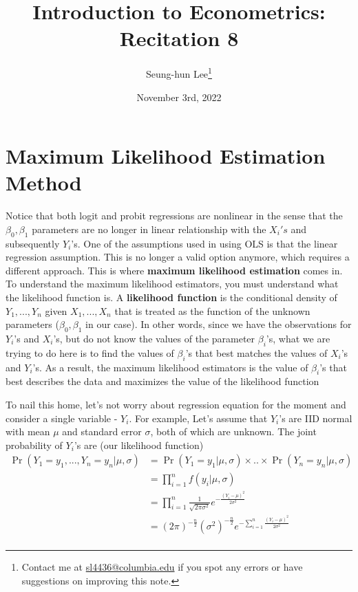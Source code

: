 \documentclass[12pt]{article}
\title{Introduction to Econometrics: Recitation 8}
\theoremstyle{definition}
\theoremstyle{property}
\theoremstyle{assumption}
\theoremstyle{example}
\theoremstyle{comment}
\begin{document}
\linespread{1.25}
\onehalfspacing

\author{Seung-hun Lee\footnote{Contact me at \href{mailto:sl4436@columbia.edu}{sl4436@columbia.edu} if you spot any errors or have suggestions on improving this note.}}
\date{November 3rd, 2022}
\maketitle
\thispagestyle{firstpage}

\section{Maximum Likelihood Estimation Method}
Notice that both logit and probit regressions are nonlinear in the sense that the $\beta_0, \beta_1$ parameters are no longer in linear relationship with the $X_i's$ and subsequently $Y_i$'s. One of the assumptions used in using OLS is that the linear regression assumption. This is no longer a valid option anymore, which requires a different approach. This is where \textbf{maximum likelihood estimation} comes in. To understand the maximum likelihood estimators, you must understand what the likelihood function is. A \textbf{likelihood function} is the conditional density of $Y_1,...,Y_n$ given $X_1,...,X_n$ that is treated as the function of the unknown parameters ($\beta_0, \beta_1$ in our case). In other words, since we have the observations for $Y_i$'s and $X_i$'s, but do  not know the values of the parameter $\beta_i$'s, what we are trying to do here is to find the values of $\beta_i$'s that best matches the values of $X_i$'s and $Y_i$'s. As a result, the maximum likelihood estimators is the value of $\beta_i$'s that best describes the data and maximizes the value of the likelihood function \par\medskip
To nail this home, let's not worry about regression equation for the moment and consider a single variable - $Y_i$. For example, Let's assume that $Y_i$'s are IID normal with mean $\mu$ and standard error $\sigma$, both of which are unknown. The joint probability of $Y_i$'s are (our likelihood function)
\[
\begin{aligned}
\Pr(Y_1=y_1,...,Y_n=y_n|\mu,\sigma)&=\Pr(Y_1 = y_1|\mu,\sigma)\times..\times\Pr(Y_n=y_n|\mu,\sigma)\\
&=\prod_{i=1}^nf(y_i|\mu,\sigma)\\
&=\prod_{i=1}^n\frac{1}{\sqrt{2\pi\sigma^2}}e^{-\frac{(Y_i-\mu)^2}{2\sigma^2}}\\
&=(2\pi)^{-\frac{n}{2}} (\sigma^2)^{-\frac{n}{2}}e^{-\sum_{i=1}^n\frac{(Y_i-\mu)^2}{2\sigma^2}}\\
\end{aligned}
\]
\end{document}
